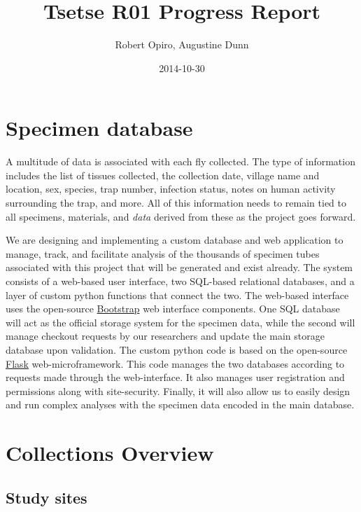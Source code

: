 \documentclass[letterpaper]{report}
\title{Tsetse R01 Progress Report\\\vspace{0.5em}{\large Sampling and Databasing}}
\author{Robert Opiro, Augustine Dunn}
\date{2014-10-30}
\begin{document}
\maketitle

{
\hypersetup{linkcolor=black}
\setcounter{tocdepth}{3}
\tableofcontents
}
\section{Specimen database}\label{specimen-database}

A multitude of data is associated with each fly collected. The type of
information includes the list of tissues collected, the collection date,
village name and location, sex, species, trap number, infection status,
notes on human activity surrounding the trap, and more. All of this
information needs to remain tied to all specimens, materials, and
\emph{data} derived from these as the project goes forward.

We are designing and implementing a custom database and web application
to manage, track, and facilitate analysis of the thousands of specimen
tubes associated with this project that will be generated and exist
already. The system consists of a web-based user interface, two
SQL-based relational databases, and a layer of custom python functions
that connect the two. The web-based interface uses the open-source
\href{http://getbootstrap.com/}{Bootstrap} web interface components. One
SQL database will act as the official storage system for the specimen
data, while the second will manage checkout requests by our researchers
and update the main storage database upon validation. The custom python
code is based on the open-source
\href{https://github.com/mitsuhiko/flask}{Flask} web-microframework.
This code manages the two databases according to requests made through
the web-interface. It also manages user registration and permissions
along with site-security. Finally, it will also allow us to easily
design and run complex analyses with the specimen data encoded in the
main database.

\section{Collections Overview}\label{collections-overview}

\subsection{Study sites}\label{study-sites}
\end{document}
